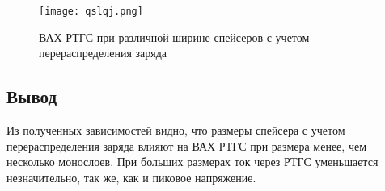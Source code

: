 \begin{figure}[h!]
	\centering
	\texttt{[image: qslqj.png]}
	\caption{ВАХ РТГС при различной ширине спейсеров с учетом перераспределения заряда}
	\label{fig:qslqj}
\end{figure}

\subsection{Вывод}
Из полученных зависимостей видно, что размеры спейсера с учетом перераспределения заряда влияют на ВАХ РТГС при размера менее, чем несколько монослоев. При больших размерах ток через РТГС уменьшается незначительно, так же, как и пиковое напряжение.